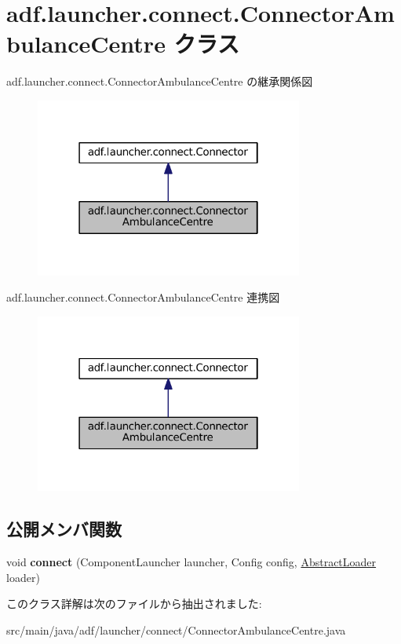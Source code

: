 \hypertarget{classadf_1_1launcher_1_1connect_1_1ConnectorAmbulanceCentre}{}\section{adf.\+launcher.\+connect.\+Connector\+Ambulance\+Centre クラス}
\label{classadf_1_1launcher_1_1connect_1_1ConnectorAmbulanceCentre}


adf.\+launcher.\+connect.\+Connector\+Ambulance\+Centre の継承関係図
\nopagebreak
\begin{figure}[H]
\begin{center}
\leavevmode
\includegraphics[width=250pt]{classadf_1_1launcher_1_1connect_1_1ConnectorAmbulanceCentre__inherit__graph}
\end{center}
\end{figure}


adf.\+launcher.\+connect.\+Connector\+Ambulance\+Centre 連携図
\nopagebreak
\begin{figure}[H]
\begin{center}
\leavevmode
\includegraphics[width=250pt]{classadf_1_1launcher_1_1connect_1_1ConnectorAmbulanceCentre__coll__graph}
\end{center}
\end{figure}
\subsection*{公開メンバ関数}
\begin{DoxyCompactItemize}
\item 
\hypertarget{classadf_1_1launcher_1_1connect_1_1ConnectorAmbulanceCentre_a82e17ab030924e8c0d2b53d030dc330e}{}\label{classadf_1_1launcher_1_1connect_1_1ConnectorAmbulanceCentre_a82e17ab030924e8c0d2b53d030dc330e} 
void {\bfseries connect} (Component\+Launcher launcher, Config config, \hyperlink{classadf_1_1component_1_1AbstractLoader}{Abstract\+Loader} loader)
\end{DoxyCompactItemize}


このクラス詳解は次のファイルから抽出されました\+:\begin{DoxyCompactItemize}
\item 
src/main/java/adf/launcher/connect/Connector\+Ambulance\+Centre.\+java\end{DoxyCompactItemize}
